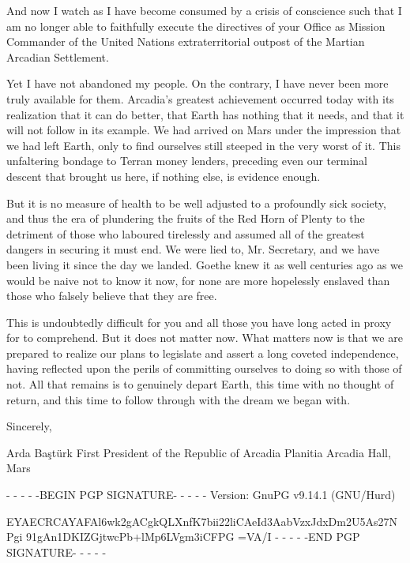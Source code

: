 And now I watch as I have become consumed by a crisis of conscience such that I am no longer able to faithfully execute the directives of your Office as Mission Commander of the United Nations extraterritorial outpost of the Martian Arcadian Settlement.

Yet I have not abandoned my people. On the contrary, I have never been more truly available for them. Arcadia's greatest achievement occurred today with its realization that it can do better, that Earth has nothing that it needs, and that it will not follow in its example. We had arrived on Mars under the impression that we had left Earth, only to find ourselves still steeped in the very worst of it. This unfaltering bondage to Terran money lenders, preceding even our terminal descent that brought us here, if nothing else, is evidence enough.

But it is no measure of health to be well adjusted to a profoundly sick society, and thus the era of plundering the fruits of the Red Horn of Plenty to the detriment of those who laboured tirelessly and assumed all of the greatest dangers in securing it must end. We were lied to, Mr. Secretary, and we have been living it since the day we landed. Goethe knew it as well centuries ago as we would be naive not to know it now, for none are more hopelessly enslaved than those who falsely believe that they are free.

This is undoubtedly difficult for you and all those you have long acted in proxy for to comprehend. But it does not matter now. What matters now is that we are prepared to realize our plans to legislate and assert a long coveted independence, having reflected upon the perils of committing ourselves to doing so with those of not. All that remains is to genuinely depart Earth, this time with no thought of return, and this time to follow through with the dream we began with.

Sincerely, 

\hskip 1.5cm 
   
Arda Baştürk
First President of the Republic of Arcadia Planitia
Arcadia Hall, Mars

- - - - -BEGIN PGP SIGNATURE- - - - -
Version: GnuPG v9.14.1 (GNU/Hurd)

EYAECRCAYAFAl6wk2gACgkQLXnfK7bii22liCAeId3AabVzxJdxDm2U5As27NPgi
91gAn1DKIZGjtwcPb+lMp6LVgm3iCFPG
=VA/I
- - - - -END PGP SIGNATURE- - - - -
\stoplines

